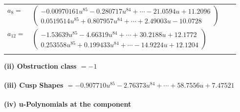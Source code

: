 \documentclass[1p]{elsarticle_modified}
\theoremstyle{definition}
\begin{document}
\begin{tabular}{m{7pt} m{180pt} m{7pt} m{180pt} }
\flushright $a_{8}=$&$\begin{pmatrix}-0.00970161 u^{85}-0.280717 u^{84}+\cdots-21.0594 u+11.2096\\0.0519514 u^{85}+0.807957 u^{84}+\cdots+2.49003 u-10.0728\end{pmatrix}$ \\
\flushright $a_{12}=$&$\begin{pmatrix}-1.53639 u^{85}-4.66319 u^{84}+\cdots+30.2188 u+12.1772\\0.253558 u^{85}+0.199433 u^{84}+\cdots-14.9224 u+12.1204\end{pmatrix}$\\&\end{tabular}
\flushleft \textbf{(ii) Obstruction class $= -1$}\\~\\
\flushleft \textbf{(iii) Cusp Shapes $= -0.907710 u^{85}-2.76373 u^{84}+\cdots+58.7556 u+7.47521$}\\~\\
\newpage\renewcommand{\arraystretch}{1}
\flushleft \textbf{(iv) u-Polynomials at the component}\newline \\
\end{document}
